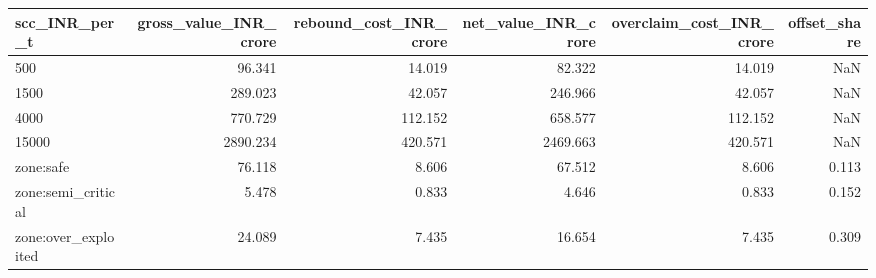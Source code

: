 \begin{tabular}{lrrrrr}
\toprule
scc_INR_per_t & gross_value_INR_crore & rebound_cost_INR_crore & net_value_INR_crore & overclaim_cost_INR_crore & offset_share \\
\midrule
500 & 96.341 & 14.019 & 82.322 & 14.019 & NaN \\
1500 & 289.023 & 42.057 & 246.966 & 42.057 & NaN \\
4000 & 770.729 & 112.152 & 658.577 & 112.152 & NaN \\
15000 & 2890.234 & 420.571 & 2469.663 & 420.571 & NaN \\
zone:safe & 76.118 & 8.606 & 67.512 & 8.606 & 0.113 \\
zone:semi_critical & 5.478 & 0.833 & 4.646 & 0.833 & 0.152 \\
zone:over_exploited & 24.089 & 7.435 & 16.654 & 7.435 & 0.309 \\
\bottomrule
\end{tabular}
